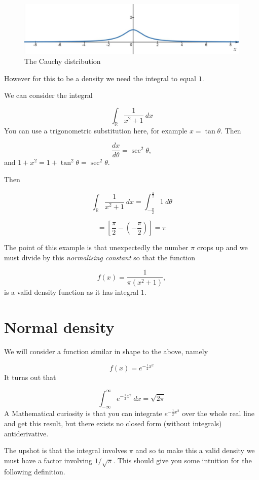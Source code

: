 \documentclass[
]{book}
\theoremstyle{definition}
\theoremstyle{definition}
\theoremstyle{definition}
\theoremstyle{definition}
\theoremstyle{remark}
\begin{document}
\begin{figure}

{\centering \includegraphics[width=0.75\linewidth]{./figures/cauchy} 

}

\caption{The Cauchy distribution}\label{fig:cauchy}
\end{figure}

However for this to be a density we need the integral to equal \(1\).

We can consider the integral

\[\int_{\mathbb{R}}\frac{1}{x^2+1} \ dx\]
You can use a trigonometric substitution here, for example \(x=\tan \theta\). Then

\[\frac{dx}{d\theta} = \sec^2\theta,\]
and \(1+x^2 = 1+\tan^2\theta = \sec^2 \theta\).

Then

\[\int_{\mathbb{R}}\frac{1}{x^2+1} \ dx = \int_{-\frac{\pi}{2}}^{\frac{\pi}{2}}1 \ d\theta \]

\[ = \left[\frac{\pi}{2} - \left(- \frac{\pi}{2}\right)\right] = \pi\]

The point of this example is that unexpectedly the number \(\pi\) crops up and we must divide by this \emph{normalising constant} so that the function

\[f(x) = \frac{1}{\pi(x^2+1)} ,\]
is a valid density function as it has integral \(1\).

\hypertarget{normal-density}{%
\section{Normal density}\label{normal-density}}

We will consider a function similar in shape to the above, namely

\[f(x) = e^{-\frac{1}{2}x^2} \]
It turns out that

\[\int _{-\infty}^{\infty} e^{-\frac{1}{2}x^2} \ dx = \sqrt{2\pi}\]
A Mathematical curiosity is that you can integrate \(e^{-\frac{1}{2}x^2}\) over the whole real line and get this result, but there exists no closed form (without integrals) antiderivative.

The upshot is that the integral involves \(\pi\) and so to make this a valid density we must have a factor involving \(1/{\sqrt{\pi}}.\) This should give you some intuition for the following definition.
\end{document}
